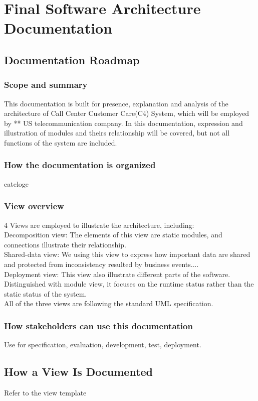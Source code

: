 \documentclass{article}
\begin{document}
	\section{Final Software Architecture Documentation}
	\subsection{Documentation Roadmap}
	\subsubsection{Scope and summary}
	This documentation is built for presence, explanation and analysis of the architecture of Call Center Customer Care(C4) System, which will be employed by ** US telecommunication company. In this documentation, expression and illustration of modules and theirs relationship will be covered, but not all functions of the system are included.
	\subsubsection{How the documentation is organized}
	cateloge
	\subsubsection{View overview}
	4 Views are employed to illustrate the architecture, including:\\  
	Decomposition view: The elements of this view are static modules, and connections illustrate their relationship.\\  
	Shared-data view: We using this view to express how important data are shared and protected from inconsistency resulted by business events....  \\
	Deployment view: This view also illustrate different parts of the software. Distinguished with module view, it focuses on the runtime status rather than the static status of the system.\\
	All of the three views are following the standard UML specification.
	\subsubsection{How stakeholders can use this documentation}
	Use for specification, evaluation, development, test, deployment.

	\subsection{How a View Is Documented}
	Refer to the view template
\end{document}
